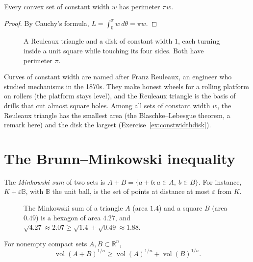 \begin{corollary}[Barbier, 1860]\label{cor:barbier}
Every convex set of constant width $w$ has perimeter $\pi w$.
\end{corollary}

\begin{proof}
By Cauchy's formula, $L=\int_0^\pi w\,d\theta=\pi w$.
\end{proof}

\begin{figure}[ht]
\centering
{}
\caption{A Reuleaux triangle and a disk of constant width $1$, each turning inside a unit square while touching its four sides. Both have perimeter $\pi$.}
\label{fig:reuleaux}
\end{figure}

Curves of constant width are named after Franz Reuleaux, an engineer who studied mechanisms in the 1870s. They make honest wheels for a rolling platform on
rollers (the platform stays level), and the Reuleaux triangle is the basis of drills that cut almost square holes. Among all sets of constant width $w$, the
Reuleaux triangle has the smallest area (the Blaschke--Lebesgue theorem, a remark here) and the disk the largest (Exercise~\ref{ex:constwidthdisk}).

\section{The Brunn--Minkowski inequality}

The \emph{Minkowski sum} of two sets is $A+B=\{a+b:a\in A,\ b\in B\}$. For instance, $K+\varepsilon\mathbb B$, with $\mathbb B$ the unit ball, is the set of
points at distance at most $\varepsilon$ from $K$.

\begin{figure}[ht]
\centering
{}
\caption{The Minkowski sum of a triangle $A$ (area $1.4$) and a square $B$ (area $0.49$) is a hexagon of area $4.27$, and
$\sqrt{4.27}\approx2.07\ge\sqrt{1.4}+\sqrt{0.49}\approx1.88$.}
\label{fig:minkowskisum}
\end{figure}

\begin{theorem}\label{thm:bm}
For nonempty compact sets $A,B\subset\mathbb R^n$,
\[
\operatorname{vol}(A+B)^{1/n}\ge\operatorname{vol}(A)^{1/n}+\operatorname{vol}(B)^{1/n}.
\]
\end{theorem}

